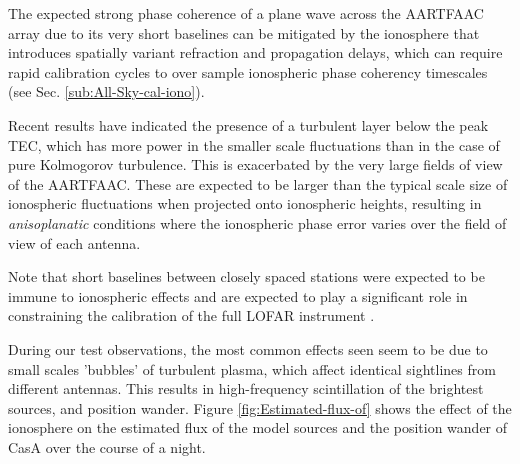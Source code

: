 \documentclass{aa}
\begin{document}
The expected  strong phase coherence of  a plane wave across  the AARTFAAC array
due  to  its very  short  baselines  can be  mitigated  by  the ionosphere  that
introduces  spatially  variant  refraction  and propagation  delays,  which  can
require  rapid calibration  cycles to  over sample  ionospheric  phase coherency
timescales (see Sec. \ref{sub:All-Sky-cal-iono}).

Recent results \citep{intema2009ionospheric} have indicated the  presence
of a  turbulent layer below  the peak  TEC, which has  more power in  the smaller
scale  fluctuations than in  the case  of pure  Kolmogorov turbulence.   This is
exacerbated by the very large fields  of view of the \mbox{AARTFAAC}.  These are
expected to  be larger than the  typical scale size  of ionospheric fluctuations
when  projected  onto  ionospheric  heights,  resulting  in  \emph{anisoplanatic
}conditions where the  ionospheric phase error varies over the  field of view of
each antenna.

Note that  short baselines between closely  spaced stations were  expected to be
immune to  ionospheric effects and are  expected to play a  significant role in
constraining    the     calibration    of    the     full    LOFAR    instrument
\citep{vdTol2007selfcallofar}.

During our  test observations, the  most common effects  seen seem to be  due to
small scales  'bubbles' of turbulent  plasma, which affect  identical sightlines
from different  antennas.  This results  in high-frequency scintillation  of the
brightest  sources,  and  position wander.   Figure  \ref{fig:Estimated-flux-of}
shows the  effect of the ionosphere on  the estimated flux of  the model sources
and the position wander of CasA over the course of a night.
\end{document}
